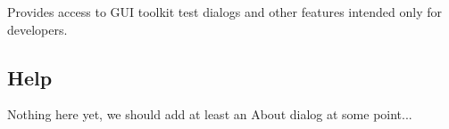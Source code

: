 Provides access to GUI toolkit test dialogs and other features intended only for developers.


\subsection{Help}

Nothing here yet, we should add at least an About dialog at some point...


\begin{comment}
\section{Toolbar}

The toolbar contains buttons and controls for the most frequently used actions.

\begin{figure}[h]
\centering
\texttt{[image: images/toolbar.png]}
\caption{ngscopeclient toolbar}
\label{toolbar}
\end{figure}

\subsection{Capture buttons}

The capture button group (Fig. \ref{capturebuttons}) contains three buttons. From left to right these are ``arm
normal trigger", ``arm one-shot trigger" and ``stop trigger".

Note that the ``normal" trigger mode still uses one-shot capture internally so that all waveform data can be downloaded
before the next trigger event.

\begin{figure}[h]
\centering
\texttt{[image: images/capture-icons.png]}
\caption{Capture control buttons}
\label{capturebuttons}
\end{figure}

\subsection{History}


\end{comment}
